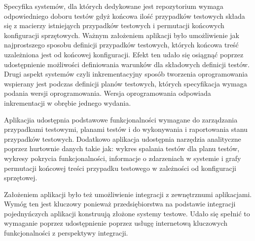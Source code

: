 Specyfika systemów, dla których dedykowane jest repozytorium wymaga odpowiedniego doboru testów gdyż końcowa ilość przypadków testowych składa się z macierzy istniejąych przypadków testowych i permutacji końcowych konfiguracji sprzętowych. Ważnym założeniem aplikacji było umożliwienie jak najprostszego sposobu definicji przypadków testowych, których końcowa treść uzależniona jest od końcowej konfiguracji. Efekt ten udało się osiągnąć poprzez udostępnienie możliwości definiowania warunków dla składowych definicji testów. Drugi aspekt systemów czyli inkrementacyjny sposób tworzenia oprogramowania wspierany jest podczas definicji planów testowych, których specyfikacja wymaga podania wersji oprogramowania. Wersja oprogramowania odpowiada inkrementacji w obrębie jednego wydania.

Aplikacjia udostępnia podstawowe funkcjonalności wymagane do zarządzania przypadkami testowymi, planami testów  i do  wykonywania i raportowania stanu przypadków testowych. Dodatkowo aplikacja udostępnia narzędzia analityczne poprzez hurtownie danych takie jak: wykres spalania testów dla planu testów, wykresy pokrycia funkcjonalności, informacje o zdarzeniach w systemie i grafy permutacji końcowej treści przypadku testowego w zależności od konfiguracji sprzętowej.

Założeniem aplikacji było też umożliwienie integracji z zewnętrznumi aplikacjami. Wymóg ten jest kluczowy ponieważ przedsiębiorstwa na podstawie integracji pojednyńczych aplikacji konstruują złożone systemy testowe. Udało się spełnić to wymaganie poprzez udostępnienie poprzez usługę internetową kluczowych funkcjonalności z perspektywy integracji.

 
